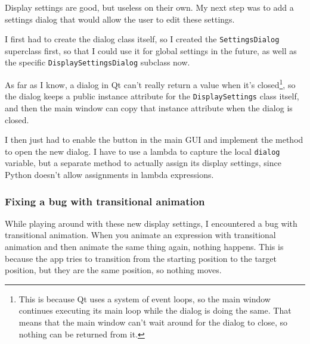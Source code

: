 \documentclass[../development.tex]{subfiles}
\begin{document}
Display settings are good, but useless on their own. My next step was to add a settings dialog that would allow the user to edit these settings.

I first had to create the dialog class itself, so I created the \texttt{SettingsDialog} superclass first, so that I could use it for global settings in the future, as well as the specific \texttt{DisplaySettingsDialog} subclass now.

As far as I know, a dialog in Qt can't really return a value when it's closed\footnote{This is because Qt uses a system of event loops, so the main window continues executing its main loop while the dialog is doing the same. That means that the main window can't wait around for the dialog to close, so nothing can be returned from it.}, so the dialog keeps a public instance attribute for the \texttt{DisplaySettings} class itself, and then the main window can copy that instance attribute when the dialog is closed.


I then just had to enable the button in the main GUI and implement the method to open the new dialog. I have to use a lambda to capture the local \texttt{dialog} variable, but a separate method to actually assign its display settings, since Python doesn't allow assignments in lambda expressions.



\subsubsection{Fixing a bug with transitional animation\label{development:adding-display-settings:fixing-a-bug-with-transitional-animation}}

While playing around with these new display settings, I encountered a bug with transitional animation. When you animate an expression with transitional animation and then animate the same thing again, nothing happens. This is because the app tries to transition from the starting position to the target position, but they are the same position, so nothing moves.
\end{document}
